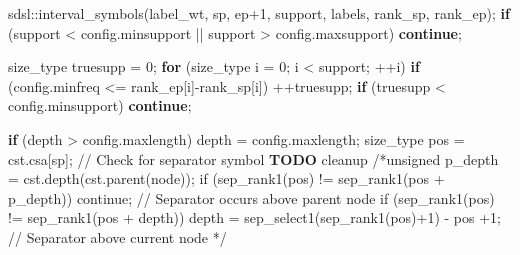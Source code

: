 \documentclass[
]{article}
\newenvironment{Shaded}{\begin{snugshade}}{\end{snugshade}}
\newcommand{\AlertTok}[1]{\textcolor[rgb]{0.58,0.85,0.30}{\textbf{\colorbox[rgb]{0.30,0.12,0.14}{#1}}}}
\newcommand{\CommentTok}[1]{\textcolor[rgb]{0.48,0.49,0.49}{#1}}
\newcommand{\ControlFlowTok}[1]{\textcolor[rgb]{0.99,0.74,0.29}{\textbf{#1}}}
\newcommand{\DecValTok}[1]{\textcolor[rgb]{0.96,0.45,0.00}{#1}}
\newcommand{\NormalTok}[1]{\textcolor[rgb]{0.81,0.81,0.76}{#1}}
\newcommand{\OperatorTok}[1]{\textcolor[rgb]{0.81,0.81,0.76}{#1}}
\begin{document}
\begin{Shaded}
\begin{Highlighting}[]
\NormalTok{        sdsl}\OperatorTok{::}\NormalTok{interval\_symbols}\OperatorTok{(}\NormalTok{label\_wt}\OperatorTok{,}\NormalTok{ sp}\OperatorTok{,}\NormalTok{ ep}\OperatorTok{+}\DecValTok{1}\OperatorTok{,}\NormalTok{ support}\OperatorTok{,}\NormalTok{ labels}\OperatorTok{,}\NormalTok{ rank\_sp}\OperatorTok{,}\NormalTok{ rank\_ep}\OperatorTok{);}
        \ControlFlowTok{if} \OperatorTok{(}\NormalTok{support }\OperatorTok{\textless{}}\NormalTok{ config}\OperatorTok{.}\NormalTok{minsupport }\OperatorTok{||}\NormalTok{ support }\OperatorTok{\textgreater{}}\NormalTok{ config}\OperatorTok{.}\NormalTok{maxsupport}\OperatorTok{)}
            \ControlFlowTok{continue}\OperatorTok{;}
        
\NormalTok{        size\_type truesupp }\OperatorTok{=} \DecValTok{0}\OperatorTok{;}
        \ControlFlowTok{for} \OperatorTok{(}\NormalTok{size\_type i }\OperatorTok{=} \DecValTok{0}\OperatorTok{;}\NormalTok{ i }\OperatorTok{\textless{}}\NormalTok{ support}\OperatorTok{;} \OperatorTok{++}\NormalTok{i}\OperatorTok{)}
            \ControlFlowTok{if} \OperatorTok{(}\NormalTok{config}\OperatorTok{.}\NormalTok{minfreq }\OperatorTok{\textless{}=}\NormalTok{ rank\_ep}\OperatorTok{[}\NormalTok{i}\OperatorTok{]{-}}\NormalTok{rank\_sp}\OperatorTok{[}\NormalTok{i}\OperatorTok{])}
                \OperatorTok{++}\NormalTok{truesupp}\OperatorTok{;}
        \ControlFlowTok{if} \OperatorTok{(}\NormalTok{truesupp }\OperatorTok{\textless{}}\NormalTok{ config}\OperatorTok{.}\NormalTok{minsupport}\OperatorTok{)}
            \ControlFlowTok{continue}\OperatorTok{;}
        
        \ControlFlowTok{if} \OperatorTok{(}\NormalTok{depth }\OperatorTok{\textgreater{}}\NormalTok{ config}\OperatorTok{.}\NormalTok{maxlength}\OperatorTok{)}
\NormalTok{            depth }\OperatorTok{=}\NormalTok{ config}\OperatorTok{.}\NormalTok{maxlength}\OperatorTok{;}
\NormalTok{        size\_type pos }\OperatorTok{=}\NormalTok{ cst}\OperatorTok{.}\NormalTok{csa}\OperatorTok{[}\NormalTok{sp}\OperatorTok{];}
        \CommentTok{// Check for separator symbol }\AlertTok{TODO}\CommentTok{ cleanup}
        \CommentTok{/*unsigned p\_depth = cst.depth(cst.parent(node));}
\CommentTok{        if (sep\_rank1(pos) != sep\_rank1(pos + p\_depth))}
\CommentTok{            continue; // Separator occurs above parent node}
\CommentTok{        if (sep\_rank1(pos) != sep\_rank1(pos + depth))}
\CommentTok{            depth = sep\_select1(sep\_rank1(pos)+1) {-} pos +1; // Separator above current node      }
\CommentTok{        */}
        

\end{Highlighting}
\end{Shaded}
\end{document}
